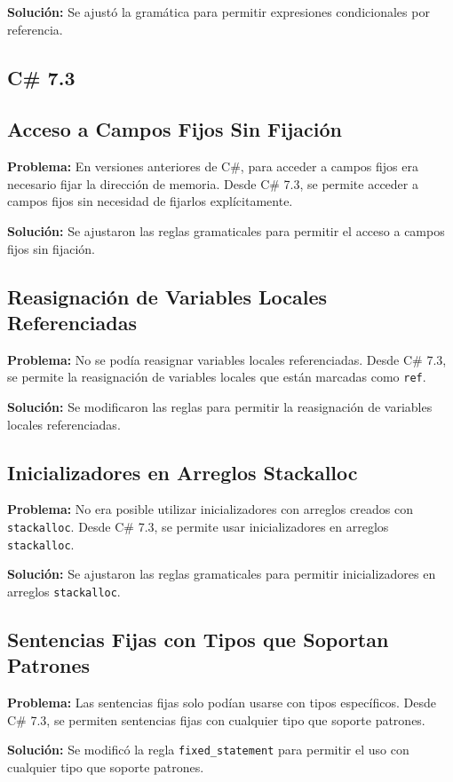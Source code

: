 \textbf{Solución:} Se ajustó la gramática para permitir expresiones condicionales por referencia.


\subsection{C\# 7.3}

\subsection*{Acceso a Campos Fijos Sin Fijación}
\textbf{Problema:} En versiones anteriores de C\#, para acceder a campos fijos era necesario fijar la dirección de memoria. Desde C\# 7.3, se permite acceder a campos fijos sin necesidad de fijarlos explícitamente.

\textbf{Solución:} Se ajustaron las reglas gramaticales para permitir el acceso a campos fijos sin fijación.

\subsection*{Reasignación de Variables Locales Referenciadas}
\textbf{Problema:} No se podía reasignar variables locales referenciadas. Desde C\# 7.3, se permite la reasignación de variables locales que están marcadas como \texttt{ref}.

\textbf{Solución:} Se modificaron las reglas para permitir la reasignación de variables locales referenciadas.

\subsection*{Inicializadores en Arreglos Stackalloc}
\textbf{Problema:} No era posible utilizar inicializadores con arreglos creados con \texttt{stackalloc}. Desde C\# 7.3, se permite usar inicializadores en arreglos \texttt{stackalloc}.

\textbf{Solución:} Se ajustaron las reglas gramaticales para permitir inicializadores en arreglos \texttt{stackalloc}.

\subsection*{Sentencias Fijas con Tipos que Soportan Patrones}
\textbf{Problema:} Las sentencias fijas solo podían usarse con tipos específicos. Desde C\# 7.3, se permiten sentencias fijas con cualquier tipo que soporte patrones.

\textbf{Solución:} Se modificó la regla \texttt{fixed\_statement} para permitir el uso con cualquier tipo que soporte patrones.

